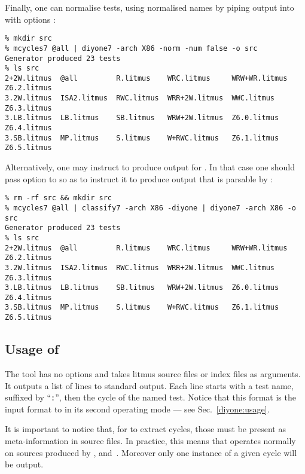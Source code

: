 Finally, one can normalise tests, using normalised names by piping
\mcycles{} output into \diyone{} with options
:
\begin{verbatim}
% mkdir src
% mcycles7 @all | diyone7 -arch X86 -norm -num false -o src
Generator produced 23 tests
% ls src
2+2W.litmus  @all         R.litmus    WRC.litmus     WRW+WR.litmus  Z6.2.litmus
3.2W.litmus  ISA2.litmus  RWC.litmus  WRR+2W.litmus  WWC.litmus     Z6.3.litmus
3.LB.litmus  LB.litmus    SB.litmus   WRW+2W.litmus  Z6.0.litmus    Z6.4.litmus
3.SB.litmus  MP.litmus    S.litmus    W+RWC.litmus   Z6.1.litmus    Z6.5.litmus
\end{verbatim}
Alternatively, one may instruct \classify{} to produce output for
\diyone. In that case one should pass option  to \classify{}
so as to instruct it to produce output that is parsable by \diyone:
\begin{verbatim}
% rm -rf src && mkdir src
% mcycles7 @all | classify7 -arch X86 -diyone | diyone7 -arch X86 -o src
Generator produced 23 tests
% ls src
2+2W.litmus  @all         R.litmus    WRC.litmus     WRW+WR.litmus  Z6.2.litmus
3.2W.litmus  ISA2.litmus  RWC.litmus  WRR+2W.litmus  WWC.litmus     Z6.3.litmus
3.LB.litmus  LB.litmus    SB.litmus   WRW+2W.litmus  Z6.0.litmus    Z6.4.litmus
3.SB.litmus  MP.litmus    S.litmus    W+RWC.litmus   Z6.1.litmus    Z6.5.litmus
\end{verbatim}


\subsection{Usage of \mcycles{}}
The tool \mcycles{} has no options and takes litmus source files or
index files as arguments.
It outputs a list of lines to standard output.
Each line starts with a test name, suffixed by ``\texttt{:}'', then
the cycle of the named test. Notice that this format is the input format
to \diyone{} in its second operating mode --- see Sec.~\ref{diyone:usage}.

It is important to notice that, for \mcycles{} to extract cycles, those
must be present as meta-information in source files.
In practice, this means that  \mcycles{} operates normally on
sources produced by \diyone, \diycross{} and~\diy.
Moreover only one instance of a given cycle will be output.


